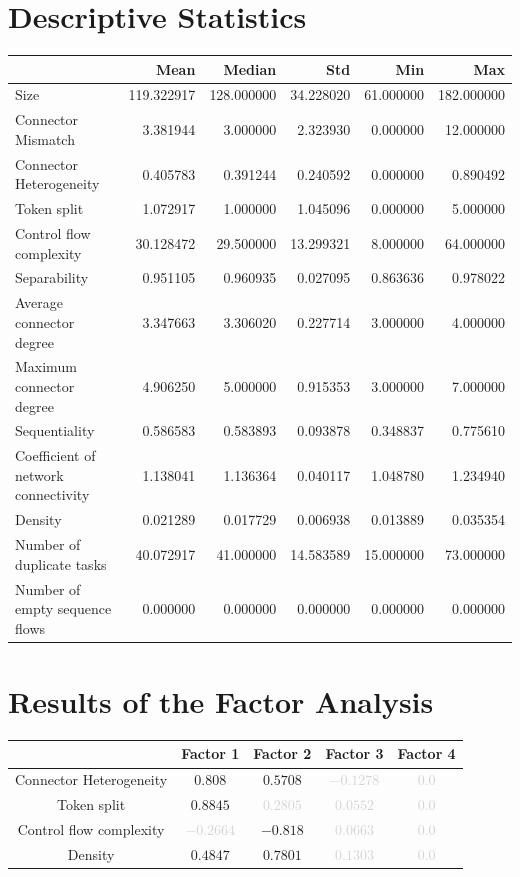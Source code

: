 \documentclass[a4paper]{article}
\begin{document}
\section*{Descriptive Statistics}
\begin{center}
\begin{tabular}{lrrrrr}
\toprule
 & Mean & Median & Std & Min & Max \\
\midrule
Size & 119.322917 & 128.000000 & 34.228020 & 61.000000 & 182.000000 \\
Connector Mismatch & 3.381944 & 3.000000 & 2.323930 & 0.000000 & 12.000000 \\
Connector Heterogeneity & 0.405783 & 0.391244 & 0.240592 & 0.000000 & 0.890492 \\
Token split & 1.072917 & 1.000000 & 1.045096 & 0.000000 & 5.000000 \\
Control flow complexity & 30.128472 & 29.500000 & 13.299321 & 8.000000 & 64.000000 \\
Separability & 0.951105 & 0.960935 & 0.027095 & 0.863636 & 0.978022 \\
Average connector degree & 3.347663 & 3.306020 & 0.227714 & 3.000000 & 4.000000 \\
Maximum connector degree & 4.906250 & 5.000000 & 0.915353 & 3.000000 & 7.000000 \\
Sequentiality & 0.586583 & 0.583893 & 0.093878 & 0.348837 & 0.775610 \\
Coefficient of network connectivity & 1.138041 & 1.136364 & 0.040117 & 1.048780 & 1.234940 \\
Density & 0.021289 & 0.017729 & 0.006938 & 0.013889 & 0.035354 \\
Number of duplicate tasks & 40.072917 & 41.000000 & 14.583589 & 15.000000 & 73.000000 \\
Number of empty sequence flows & 0.000000 & 0.000000 & 0.000000 & 0.000000 & 0.000000 \\
\bottomrule
\end{tabular}
\end{center}

\section*{Results of the Factor Analysis}
\begin{center}
\begin{tabular}{ccccc} \toprule 
 & Factor 1 & Factor 2 & Factor 3 & Factor 4 \\ \midrule 
Connector Heterogeneity & $0.808$ & $0.5708$ & \textcolor{lightgray}{$-0.1278$} & \textcolor{lightgray}{$0.0$} \\ 
Token split & $0.8845$ & \textcolor{lightgray}{$0.2805$} & \textcolor{lightgray}{$0.0552$} & \textcolor{lightgray}{$0.0$} \\ 
Control flow complexity & \textcolor{lightgray}{$-0.2664$} & $-0.818$ & \textcolor{lightgray}{$0.0663$} & \textcolor{lightgray}{$0.0$} \\ 
Density & $0.4847$ & $0.7801$ & \textcolor{lightgray}{$0.1303$} & \textcolor{lightgray}{$0.0$} \\ 
\bottomrule
\end{tabular}
\end{center}
\end{document}
